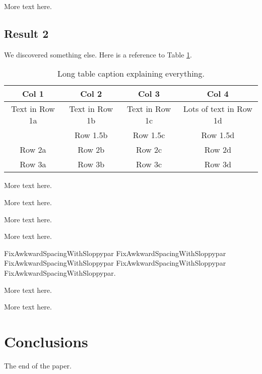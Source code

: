 \documentclass[main.tex]{subfiles}
\begin{document}
More text here.

\subsection{Result 2}
We discovered something else. Here is a reference to Table \ref{tab:paper1_tab1}.

\renewcommand{\arraystretch}{2}  %
\begin{table}[hbt!]
\centering
\begin{tabularx}{\textwidth}{c|c|c|c}  %
   \textbf{Col 1} & \textbf{Col 2} & \textbf{Col 3} & \textbf{Col 4} \\
   \hline  %
   Text in Row 1a & Text in Row 1b & Text in Row 1c & Lots of text in Row 1d \\
                  & Row 1.5b & Row 1.5c & Row 1.5d \\
   \hline
   Row 2a & Row 2b & Row 2c & Row 2d \\
   \hline
   Row 3a & Row 3b & Row 3c & Row 3d \\
\end{tabularx}
\caption[Short table caption for List of Tables]{Long table caption explaining everything.}
\label{tab:paper1_tab1}
\end{table}

More text here.

More text here.

More text here.

More text here.

\begin{sloppypar}
FixAwkwardSpacingWithSloppypar FixAwkwardSpacingWithSloppypar FixAwkwardSpacingWithSloppypar FixAwkwardSpacingWithSloppypar FixAwkwardSpacingWithSloppypar.
\end{sloppypar}

More text here.

More text here.

\section{Conclusions}
The end of the paper.

\iftoggle{biblatex}{
  \ifSubfilesClassLoaded{\printbibliography}{}
}{
  \ifSubfilesClassLoaded{}{}
}
\end{document}
